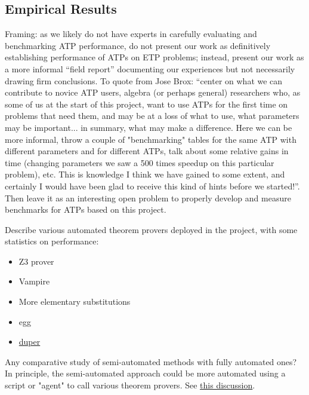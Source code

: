 \subsection{Empirical Results}

Framing: as we likely do not have experts in carefully evaluating and benchmarking ATP performance, do not present our work as definitively establishing performance of ATPs on ETP problems; instead, present our work as a more informal ``field report'' documenting our experiences but not necessarily drawing firm conclusions.  To quote from Jose Brox: ``center on what we can contribute to novice ATP users, algebra (or perhaps general) researchers who, as some of us at the start of this project, want to use ATPs for the first time on problems that need them, and may be at a loss of what to use, what parameters may be important... in summary, what may make a difference. Here we can be more informal, throw a couple of "benchmarking" tables for the same ATP with different parameters and for different ATPs, talk about some relative gains in time (changing parameters we saw a 500 times speedup on this particular problem), etc. This is knowledge I think we have gained to some extent, and certainly I would have been glad to receive this kind of hints before we started!''.  Then leave it as an interesting open problem to properly develop and measure benchmarks for ATPs based on this project.

Describe various automated theorem provers deployed in the project, with some statistics on performance:

\begin{itemize}
    \item Z3 prover
    \item Vampire
    \item More elementary substitutions
    \item egg
    \item \href{https://leanprover.zulipchat.com/#narrow/channel/458659-Equational/topic/Austin.20pairs/near/479643838}{duper}
\end{itemize}

Any comparative study of semi-automated methods with fully automated ones? In principle, the semi-automated approach could be more automated using a script or "agent" to call various theorem provers. See \href{https://leanprover.zulipchat.com/#narrow/stream/458659-Equational/topic/A.20magma.20of.20order.20.3C.2013.20-.20for.20Equation2531.3F}{this discussion}.

